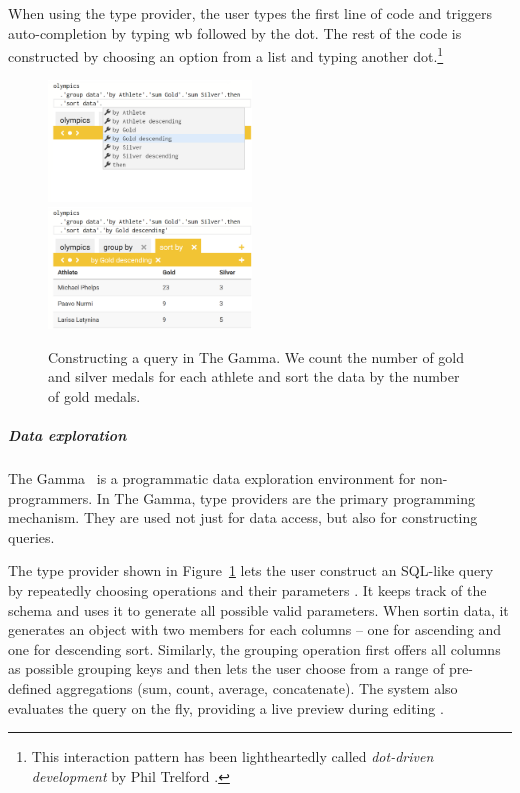 \documentclass[a4paper,UKenglish,cleveref, autoref, thm-restate]{lipics-v2021}
\newcommand{\ident}[1]{\textsf{#1}}
\begin{document}
When using the type provider, the user types the first line of code and triggers auto-completion
by typing \ident{wb} followed by the dot. The rest of the code is constructed by choosing an
option from a list and typing another dot.\footnote{This interaction pattern has been
lightheartedly called \emph{dot-driven development} by Phil Trelford \cite{seemann-2021-head}.}


\newpage

\begin{figure}[t]
\includegraphics[width=0.48\textwidth]{fig/thegamma1.png}~~
\includegraphics[width=0.48\textwidth]{fig/thegamma2.png}
\caption{Constructing a query in The Gamma. We count the number of gold and silver medals for
each athlete and sort the data by the number of gold medals.}
\label{fig:thegamma}
\end{figure}

\subparagraph{Data exploration}

The Gamma~\cite{petricek-2022-thegamma} is a programmatic data exploration environment
for non-programmers. In The Gamma, type providers are the primary programming mechanism. They
are used not just for data access, but also for constructing queries.

The type provider shown in Figure~\ref{fig:thegamma} lets the user construct an SQL-like query by
repeatedly choosing operations and their parameters \cite{petricek-2017-dotdriven}. It keeps track
of the schema and uses it to generate all possible valid parameters. When sortin data, it generates
an object with two members for each columns -- one for ascending and one for descending sort.
Similarly, the grouping operation first offers all columns as possible grouping keys and then
lets the user choose from a range of pre-defined aggregations (sum, count, average, concatenate).
The system also evaluates the query on the fly, providing a live preview during editing \cite{petricek-2020-live}.
\end{document}
